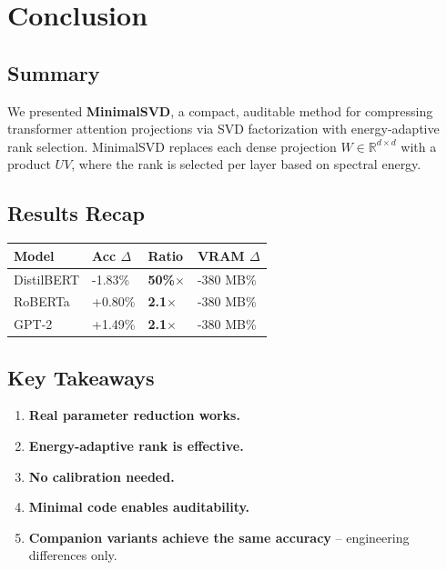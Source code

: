 
\section{Conclusion}

\subsection{Summary}

We presented \textbf{MinimalSVD}, a compact, auditable method for compressing 
transformer attention projections via SVD factorization with energy-adaptive 
rank selection. MinimalSVD replaces each dense projection 
$W \in \mathbb{R}^{d \times d}$ with a product $U V$, where the rank is 
selected per layer based on spectral energy.

\subsection{Results Recap}

\begin{table}[H]
\centering
\small
\begin{tabular}{llll}
\toprule
\textbf{Model} & \textbf{Acc $\Delta$} & \textbf{Ratio} & \textbf{VRAM $\Delta$} \\
\midrule
DistilBERT & -1.83\% & \textbf{50\%$\times$} & -380 MB\% \\
RoBERTa & +0.80\% & \textbf{2.1$\times$} & -380 MB\% \\
GPT-2 & +1.49\% & \textbf{2.1$\times$} & -380 MB\% \\
\bottomrule
\end{tabular}
\end{table}

\subsection{Key Takeaways}

\begin{enumerate}
\item \textbf{Real parameter reduction works.}
\item \textbf{Energy-adaptive rank is effective.}
\item \textbf{No calibration needed.}
\item \textbf{Minimal code enables auditability.}
\item \textbf{Companion variants achieve the same accuracy} -- engineering
  differences only.

\end{enumerate}
